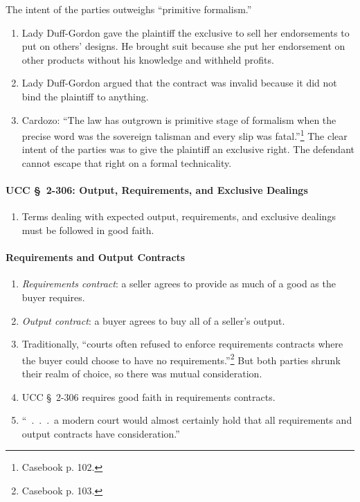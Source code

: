 The intent of the parties outweighs ``primitive formalism.''

\begin{enumerate}
    \item Lady Duff-Gordon gave the plaintiff the exclusive to sell her 
    endorsements to put on others' designs. He brought suit because she put 
    her endorsement on other products without his knowledge and withheld 
    profits.
    \item Lady Duff-Gordon argued that the contract was invalid because it did 
    not bind the plaintiff to anything.
    \item Cardozo: ``The law has outgrown is primitive stage of formalism when 
    the precise word was the sovereign talisman and every slip was 
    fatal.''\footnote{Casebook p. 102.} The clear intent of the parties was to 
    give the plaintiff an exclusive right. The defendant cannot escape that 
    right on a formal technicality.
\end{enumerate}

\paragraph{UCC \S\ 2-306: Output, Requirements, and Exclusive Dealings}

\begin{enumerate}
    \item Terms dealing with expected output, requirements, and exclusive 
    dealings must be followed in good faith.
\end{enumerate}

\paragraph{Requirements and Output Contracts}

\begin{enumerate}
    \item \emph{Requirements contract}: a seller agrees to provide as much of 
    a good as the buyer requires.
    \item \emph{Output contract}: a buyer agrees to buy all of a seller's 
    output.
    \item Traditionally, ``courts often refused to enforce requirements 
    contracts where the buyer could choose to have no 
    requirements.''\footnote{Casebook p. 103.} But both parties shrunk their 
    realm of choice, so there was mutual consideration.
    \item UCC \S\ 2-306 requires good faith in requirements contracts.
    \item ``~.~.~.~a modern court would almost certainly hold that all 
    requirements and output contracts have consideration.''
\end{enumerate}

